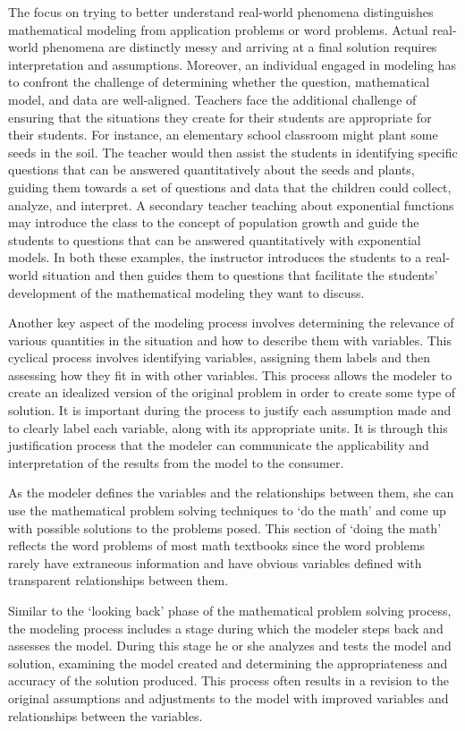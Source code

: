 \documentclass[
]{book}
\theoremstyle{definition}
\theoremstyle{definition}
\theoremstyle{definition}
\theoremstyle{remark}
\begin{document}
The focus on trying to better understand real-world phenomena distinguishes mathematical modeling from application problems or word problems. Actual real-world phenomena are distinctly messy and arriving at a final solution requires interpretation and assumptions. Moreover, an individual engaged in modeling has to confront the challenge of determining whether the question, mathematical model, and data are well-aligned. Teachers face the additional challenge of ensuring that the situations they create for their students are appropriate for their students. For instance, an elementary school classroom might plant some seeds in the soil. The teacher would then assist the students in identifying specific questions that can be answered quantitatively about the seeds and plants, guiding them towards a set of questions and data that the children could collect, analyze, and interpret. A secondary teacher teaching about exponential functions may introduce the class to the concept of population growth and guide the students to questions that can be answered quantitatively with exponential models. In both these examples, the instructor introduces the students to a real-world situation and then guides them to questions that facilitate the students' development of the mathematical modeling they want to discuss.

Another key aspect of the modeling process involves determining the relevance of various quantities in the situation and how to describe them with variables. This cyclical process involves identifying variables, assigning them labels and then assessing how they fit in with other variables. This process allows the modeler to create an idealized version of the original problem in order to create some type of solution. It is important during the process to justify each assumption made and to clearly label each variable, along with its appropriate units. It is through this justification process that the modeler can communicate the applicability and interpretation of the results from the model to the consumer.

As the modeler defines the variables and the relationships between them, she can use the mathematical problem solving techniques to `do the math' and come up with possible solutions to the problems posed. This section of `doing the math' reflects the word problems of most math textbooks since the word problems rarely have extraneous information and have obvious variables defined with transparent relationships between them.

Similar to the `looking back' phase of the mathematical problem solving process, the modeling process includes a stage during which the modeler steps back and assesses the model. During this stage he or she analyzes and tests the model and solution, examining the model created and determining the appropriateness and accuracy of the solution produced. This process often results in a revision to the original assumptions and adjustments to the model with improved variables and relationships between the variables.
\end{document}
